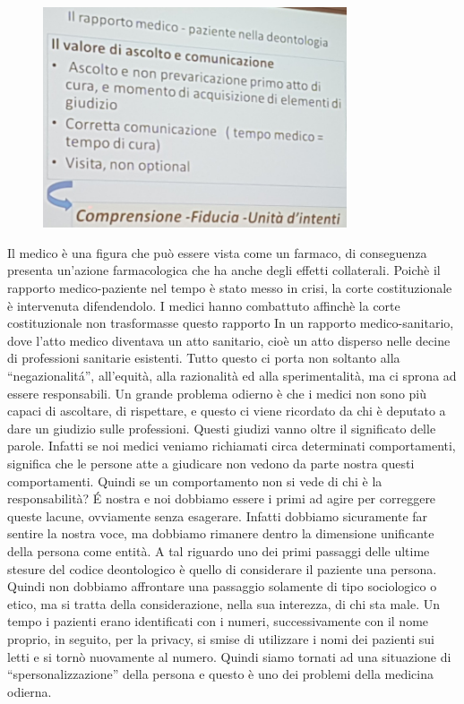 	\begin{figure}[!ht]
\centering
	\includegraphics[width=0.8\textwidth]{29/image6.jpeg}
	\end{figure}

Il medico è una figura che può essere vista come un farmaco, di
conseguenza presenta un'azione farmacologica che ha anche degli effetti
collaterali. Poichè il rapporto medico-paziente nel tempo è stato messo
in crisi, la corte costituzionale è intervenuta difendendolo. I medici
hanno combattuto affinchè la corte costituzionale non trasformasse
questo rapporto In un rapporto medico-sanitario, dove l'atto medico
diventava un atto sanitario, cioè un atto disperso nelle decine di
professioni sanitarie esistenti. Tutto questo ci porta non soltanto alla
``negazionalitá'', all'equità, alla razionalità ed alla sperimentalità,
ma ci sprona ad essere responsabili. Un grande problema odierno è che i
medici non sono più capaci di ascoltare, di rispettare, e questo ci
viene ricordato da chi è deputato a dare un giudizio sulle professioni.
Questi giudizi vanno oltre il significato delle parole. Infatti se noi
medici veniamo richiamati circa determinati comportamenti, significa che
le persone atte a giudicare non vedono da parte nostra questi
comportamenti. Quindi se un comportamento non si vede di chi è la
responsabilità? É nostra e noi dobbiamo essere i primi ad agire per
correggere queste lacune, ovviamente senza esagerare. Infatti dobbiamo
sicuramente far sentire la nostra voce, ma dobbiamo rimanere dentro la
dimensione unificante della persona come entità. A tal riguardo uno dei
primi passaggi delle ultime stesure del codice deontologico è quello di
considerare il paziente una persona. Quindi non dobbiamo affrontare una
passaggio solamente di tipo sociologico o etico, ma si tratta della
considerazione, nella sua interezza, di chi sta male. Un tempo i
pazienti erano identificati con i numeri, successivamente con il nome
proprio, in seguito, per la privacy, si smise di utilizzare i nomi dei
pazienti sui letti e si tornò nuovamente al numero. Quindi siamo tornati
ad una situazione di ``spersonalizzazione'' della persona e questo è uno
dei problemi della medicina odierna.

